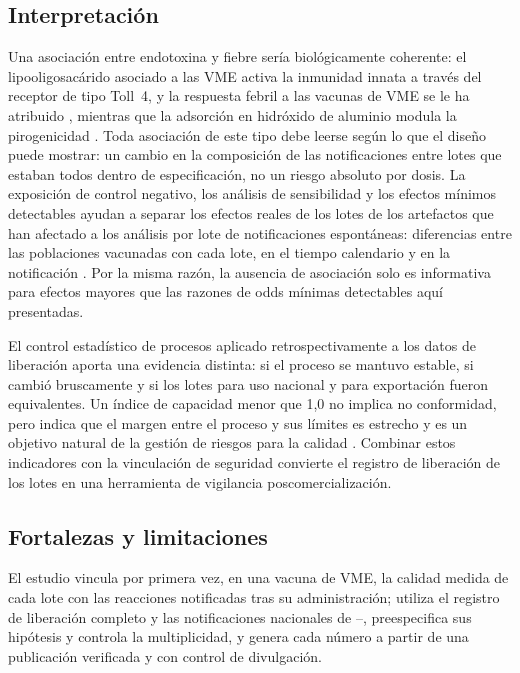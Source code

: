 \documentclass[11pt]{article}
\begin{document}
\subsection{Interpretación}\label{sec:d-interpretation}
Una asociación entre endotoxina y fiebre sería biológicamente coherente: el lipooligosacárido
asociado a las VME activa la inmunidad innata a través del receptor de tipo Toll~4, y la respuesta
febril a las vacunas de VME se le ha atribuido \cite{Sheerin2019,Zariri2016}, mientras que la
adsorción en hidróxido de aluminio modula la pirogenicidad \cite{Rosenqvist1998}. Toda asociación de
este tipo debe leerse según lo que el diseño puede mostrar: un cambio en la composición de las
notificaciones entre lotes que estaban todos dentro de especificación, no un riesgo absoluto por
dosis. La exposición de control negativo, los análisis de sensibilidad y los efectos mínimos
detectables ayudan a separar los efectos reales de los lotes de los artefactos que han afectado a los
análisis por lote de notificaciones espontáneas: diferencias entre las poblaciones vacunadas con cada
lote, en el tiempo calendario y en la notificación \cite{Hviid2023,Scott2023}. Por la misma razón, la
ausencia de asociación solo es informativa para efectos mayores que las razones de odds mínimas
detectables aquí presentadas.

El control estadístico de procesos aplicado retrospectivamente a los datos de liberación aporta una
evidencia distinta: si el proceso se mantuvo estable, si cambió bruscamente y si los lotes para uso
nacional y para exportación fueron equivalentes. Un índice de capacidad menor que 1,0 no implica no
conformidad, pero indica que el margen entre el proceso y sus límites es estrecho y es un objetivo
natural de la gestión de riesgos para la calidad \cite{ICHQ9R1,ICHQ10}. Combinar estos indicadores con
la vinculación de seguridad convierte el registro de liberación de los lotes en una herramienta de
vigilancia poscomercialización.

\subsection{Fortalezas y limitaciones}\label{sec:d-limitations}
El estudio vincula por primera vez, en una vacuna de VME, la calidad medida de cada lote con las
reacciones notificadas tras su administración; utiliza el registro de liberación completo y las
notificaciones nacionales de \VStudyFirstYear--\VStudyLastYear, preespecifica sus hipótesis y
controla la multiplicidad, y genera cada número a partir de una publicación verificada y con control
de divulgación.
\end{document}
